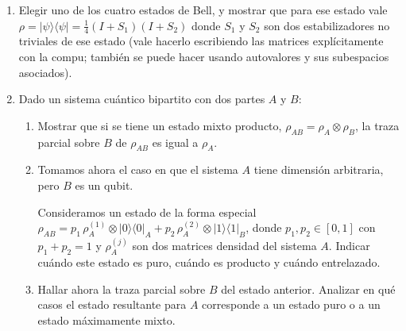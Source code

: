 \documentclass[a4paper,11pt,spanish]{article}
\newcommand{\ket}[1]{|#1\rangle}
\newcommand{\bra}[1]{\langle #1|}
\newcommand{\ketbra}[2]{\ket{#1}\bra{#2}}
\newcommand{\proj}[1]{\ketbra {#1}{#1}}
\begin{document}
\begin{enumerate}
  \medskip

   \item Elegir uno de los cuatro estados de Bell, y mostrar que para ese estado vale $\rho = \proj{\psi}=\frac{1}{4} (I+S_1)(I+S_2)$ donde $S_1$ y $S_2$ son dos estabilizadores no triviales de ese estado (vale hacerlo escribiendo las matrices explícitamente con la compu; también se puede hacer usando autovalores y sus subespacios asociados).
  \medskip

  \item Dado un sistema cu\'antico bipartito con dos partes $A$ y $B$:

  \begin{enumerate}
   \item Mostrar que si se tiene un estado mixto producto, $\rho_{AB} = \rho_A \otimes \rho_B$, la traza parcial sobre $B$ de $\rho_{AB}$ es igual a $\rho_A$.
   \item Tomamos ahora el caso en que el sistema $A$ tiene dimensi\'on arbitraria, pero $B$ es un qubit.

   Consideramos un estado de la forma especial $\rho_{AB} = p_1\, \rho_A^{(1)} \otimes \proj{0}_A + p_2\, \rho_A^{(2)} \otimes \proj{1}_B$, donde $p_1, p_2 \in [0,1]$ con $p_1+p_2=1$ y $\rho_A^{(j)}$ son dos matrices densidad del sistema $A$. Indicar cu\'ando este estado es puro, cu\'ando es producto y cu\'ando entrelazado.
   \item Hallar ahora la traza parcial sobre $B$ del estado anterior. Analizar en qu\'e casos el estado resultante para $A$ corresponde a un estado puro o a un estado m\'aximamente mixto.
  \end{enumerate}
  \medskip


\end{enumerate}
\end{document}
